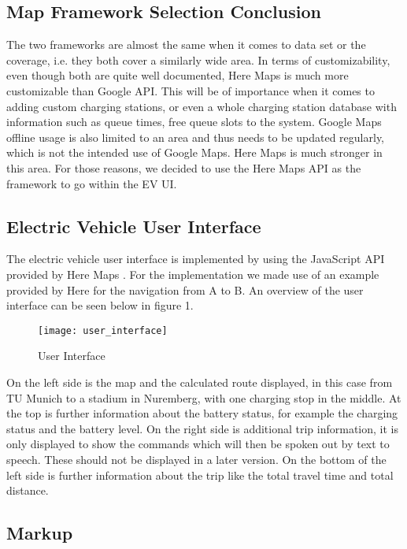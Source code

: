 \subsection{Map Framework Selection Conclusion}

The two frameworks are almost the same when it comes to data set or the coverage, i.e. they both cover a similarly wide area. In terms of customizability, even though both are quite well documented, Here Maps is much more customizable than Google API. This will be of importance when it comes to adding custom charging stations, or even a whole charging station database with information such as queue times, free queue slots to the system. Google Maps offline usage is also limited to an area and thus needs to be updated regularly, which is not the intended use of Google Maps. Here Maps is much stronger in this area. For those reasons, we decided to use the Here Maps API as the framework to go within the EV UI.  


\subsection{Electric Vehicle User Interface}

The electric vehicle user interface is implemented by using the JavaScript API provided by Here Maps \cite{driver-15} \cite{driver-16}. For the implementation we made use of an example provided by Here for the navigation from A to B. An overview of the user interface can be seen below in figure 1. 

\begin{figure}[htp]
\centering
\texttt{[image: user\_interface]}
\caption{User Interface}
\end{figure}

On the left side is the map and the calculated route displayed, in this case from TU Munich to a stadium in Nuremberg, with one charging stop in the middle. At the top is further information about the battery status, for example the charging status and the battery level. On the right side is additional trip information, it is only displayed to show the commands which will then be spoken out by text to speech. These should not be displayed in a later version. On the bottom of the left side is further information about the trip like the total travel time and total distance. 


\subsection{Markup}

